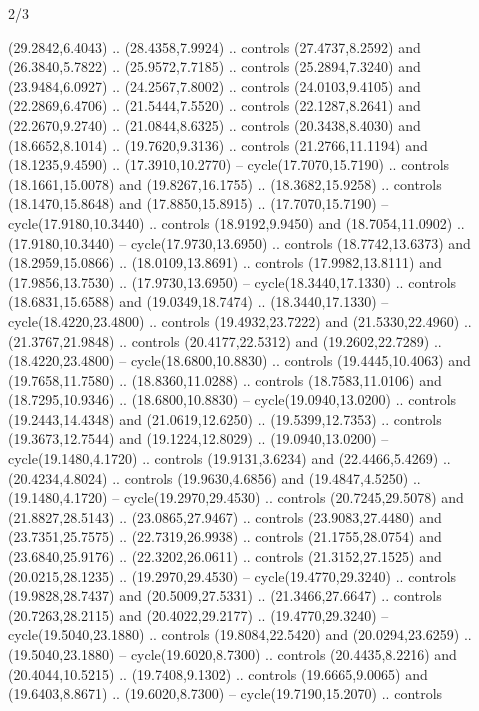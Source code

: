 \begin{flagdescription}{2/3}
\begin{scope}[yshift=\flagwidth,scale=\flagwidth/1241.93737]
\begin{scope}[y=-1mm, x=1mm,draw=gold,fill=blue,line join=miter,miter limit=4,line width=1.8\lw]
\begin{scope}[y=1mm, x=1mm, yscale=-1,shift={(573.68mm+\str,145.75)}]
\begin{scope}[scale=1.35,shift={(-9,-3)}]
\begin{scope}[scale=0.55]
\begin{scope}[scale=1.333]
    (29.2842,6.4043) .. (28.4358,7.9924) .. controls (27.4737,8.2592) and
    (26.3840,5.7822) .. (25.9572,7.7185) .. controls (25.2894,7.3240) and
    (23.9484,6.0927) .. (24.2567,7.8002) .. controls (24.0103,9.4105) and
    (22.2869,6.4706) .. (21.5444,7.5520) .. controls (22.1287,8.2641) and
    (22.2670,9.2740) .. (21.0844,8.6325) .. controls (20.3438,8.4030) and
    (18.6652,8.1014) .. (19.7620,9.3136) .. controls (21.2766,11.1194) and
    (18.1235,9.4590) .. (17.3910,10.2770) -- cycle(17.7070,15.7190) .. controls
    (18.1661,15.0078) and (19.8267,16.1755) .. (18.3682,15.9258) .. controls
    (18.1470,15.8648) and (17.8850,15.8915) .. (17.7070,15.7190) --
    cycle(17.9180,10.3440) .. controls (18.9192,9.9450) and (18.7054,11.0902) ..
    (17.9180,10.3440) -- cycle(17.9730,13.6950) .. controls (18.7742,13.6373) and
    (18.2959,15.0866) .. (18.0109,13.8691) .. controls (17.9982,13.8111) and
    (17.9856,13.7530) .. (17.9730,13.6950) -- cycle(18.3440,17.1330) .. controls
    (18.6831,15.6588) and (19.0349,18.7474) .. (18.3440,17.1330) --
    cycle(18.4220,23.4800) .. controls (19.4932,23.7222) and (21.5330,22.4960) ..
    (21.3767,21.9848) .. controls (20.4177,22.5312) and (19.2602,22.7289) ..
    (18.4220,23.4800) -- cycle(18.6800,10.8830) .. controls (19.4445,10.4063) and
    (19.7658,11.7580) .. (18.8360,11.0288) .. controls (18.7583,11.0106) and
    (18.7295,10.9346) .. (18.6800,10.8830) -- cycle(19.0940,13.0200) .. controls
    (19.2443,14.4348) and (21.0619,12.6250) .. (19.5399,12.7353) .. controls
    (19.3673,12.7544) and (19.1224,12.8029) .. (19.0940,13.0200) --
    cycle(19.1480,4.1720) .. controls (19.9131,3.6234) and (22.4466,5.4269) ..
    (20.4234,4.8024) .. controls (19.9630,4.6856) and (19.4847,4.5250) ..
    (19.1480,4.1720) -- cycle(19.2970,29.4530) .. controls (20.7245,29.5078) and
    (21.8827,28.5143) .. (23.0865,27.9467) .. controls (23.9083,27.4480) and
    (23.7351,25.7575) .. (22.7319,26.9938) .. controls (21.1755,28.0754) and
    (23.6840,25.9176) .. (22.3202,26.0611) .. controls (21.3152,27.1525) and
    (20.0215,28.1235) .. (19.2970,29.4530) -- cycle(19.4770,29.3240) .. controls
    (19.9828,28.7437) and (20.5009,27.5331) .. (21.3466,27.6647) .. controls
    (20.7263,28.2115) and (20.4022,29.2177) .. (19.4770,29.3240) --
    cycle(19.5040,23.1880) .. controls (19.8084,22.5420) and (20.0294,23.6259) ..
    (19.5040,23.1880) -- cycle(19.6020,8.7300) .. controls (20.4435,8.2216) and
    (20.4044,10.5215) .. (19.7408,9.1302) .. controls (19.6665,9.0065) and
    (19.6403,8.8671) .. (19.6020,8.7300) -- cycle(19.7190,15.2070) .. controls

\end{scope}
\end{scope}
\end{scope}
\end{scope}
\end{scope}
\end{scope}
\end{flagdescription}
